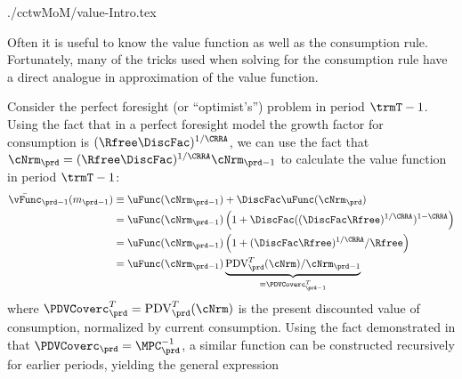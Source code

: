 \documentclass[\econtexRoot/SolvingMicroDSOPs]{subfiles}
\begin{document}
\begin{verbatimwrite}{./cctwMoM/value-Intro.tex}

  Often it is useful to know the value function as well as the consumption rule.  Fortunately, many of the tricks used when solving for the consumption rule have a direct analogue in approximation of the value function.

  Consider the perfect foresight (or ``optimist's'') problem in period $\trmT-1$.  Using the fact that in a perfect foresight model the growth factor for consumption is $(\Rfree \DiscFac)^{1/\CRRA}$, we can use the fact that $\cNrm_{\prd} = (\Rfree \DiscFac)^{1/\CRRA} \cNrm_{\prd-1}$ to calculate the value function in period $\trmT-1$:
  \begin{equation*}\begin{gathered}\begin{aligned}
        \bar{\vFunc}_{\prd-1}({m}_{\prd-1})  & \equiv  \uFunc(\cNrm_{\prd-1})+\DiscFac \uFunc(\cNrm_{\prd})
        \\  & = \uFunc(\cNrm_{\prd-1})\left(1+\DiscFac ((\DiscFac\Rfree)^{1/\CRRA})^{1-\CRRA}\right)
        \\  & = \uFunc(\cNrm_{\prd-1})\left(1+(\DiscFac\Rfree)^{1/\CRRA}/\Rfree\right)
        \\  & = \uFunc(\cNrm_{\prd-1})\underbrace{\mbox{PDV}_{\prd}^{T}(\cNrm)/\cNrm_{\prd-1}}_{\equiv \PDVCoverc_{\prd-1}^{T}}
      \end{aligned}\end{gathered}\end{equation*}
  where $\PDVCoverc_{\prd}^{T}=\mbox{PDV}_{\prd}^{T}(\cNrm)$ is the present discounted value of consumption, normalized by current consumption. Using the fact demonstrated in \cite{BufferStockTheory} that $\PDVCoverc_{\prd}=\MPC^{-1}_{\prd}$, a similar function can be constructed recursively for earlier periods, yielding the general expression \hypertarget{vFuncPF}{}
\end{verbatimwrite}
\unskip
\end{document}
